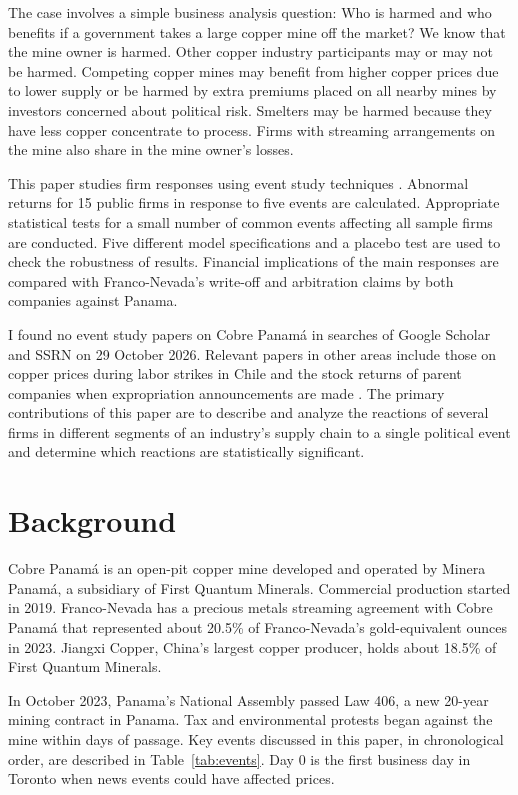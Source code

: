 \documentclass[11pt]{article}
\begin{document}
The case involves a simple business analysis question: Who is harmed and who benefits if a government takes a large copper mine off the market? We know that the mine owner is harmed. Other copper industry participants may or may not be harmed. Competing copper mines may benefit from higher copper prices due to lower supply or be harmed by extra premiums placed on all nearby mines by investors concerned about political risk. Smelters may be harmed because they have less copper concentrate to process. Firms with streaming arrangements on the mine also share in the mine owner's losses.

This paper studies firm responses using event study techniques \citep{mackinlay1997}. Abnormal returns for 15 public firms in response to five events are calculated. Appropriate statistical tests for a small number of common events affecting all sample firms are conducted. Five different model specifications and a placebo test are used to check the robustness of results. Financial implications of the main responses are compared with Franco-Nevada's write-off and arbitration claims by both companies against Panama.

I found no event study papers on Cobre Panamá in searches of Google Scholar and SSRN on 29 October 2026. Relevant papers in other areas include those on copper prices during labor strikes in Chile \citep{fernandez2023} and the stock returns of parent companies when expropriation announcements are made \citep{restrepo2016}. The primary contributions of this paper are to describe and analyze the reactions of several firms in different segments of an industry's supply chain to a single political event and determine which reactions are statistically significant.

\section{Background}

Cobre Panamá is an open-pit copper mine developed and operated by Minera Panamá, a subsidiary of First Quantum Minerals. Commercial production started in 2019. Franco-Nevada has a precious metals streaming agreement with Cobre Panamá that represented about 20.5\% of Franco-Nevada's gold-equivalent ounces in 2023. Jiangxi Copper, China's largest copper producer, holds about 18.5\% of First Quantum Minerals.

In October 2023, Panama's National Assembly passed Law 406, a new 20-year mining contract in Panama. Tax and environmental protests began against the mine within days of passage. Key events discussed in this paper, in chronological order, are described in Table~\ref{tab:events}. Day 0 is the first business day in Toronto when news events could have affected prices.
\end{document}
